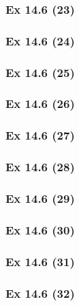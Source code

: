 \subsubsection{Ex 14.6 (23)}\label{sec:Ex_14.6.23}

\subsubsection{Ex 14.6 (24)}\label{sec:Ex_14.6.24}

\subsubsection{Ex 14.6 (25)}\label{sec:Ex_14.6.25}

\subsubsection{Ex 14.6 (26)}\label{sec:Ex_14.6.26}

\subsubsection{Ex 14.6 (27)}\label{sec:Ex_14.6.27}

\subsubsection{Ex 14.6 (28)}\label{sec:Ex_14.6.28}

\subsubsection{Ex 14.6 (29)}\label{sec:Ex_14.6.29}

\subsubsection{Ex 14.6 (30)}\label{sec:Ex_14.6.30}

\newpage		%

\subsubsection{Ex 14.6 (31)}\label{sec:Ex_14.6.31}

\subsubsection{Ex 14.6 (32)}\label{sec:Ex_14.6.32}


